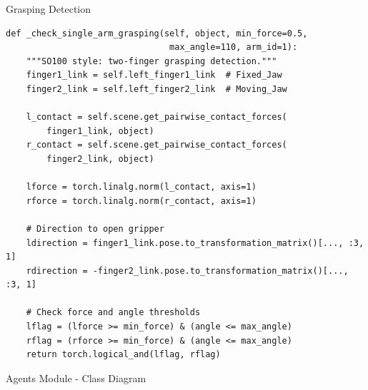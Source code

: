 \begin{frame}[fragile]{Grasping Detection}
\begin{lstlisting}
def _check_single_arm_grasping(self, object, min_force=0.5,
                                max_angle=110, arm_id=1):
    """SO100 style: two-finger grasping detection."""
    finger1_link = self.left_finger1_link  # Fixed_Jaw
    finger2_link = self.left_finger2_link  # Moving_Jaw

    l_contact = self.scene.get_pairwise_contact_forces(
        finger1_link, object)
    r_contact = self.scene.get_pairwise_contact_forces(
        finger2_link, object)

    lforce = torch.linalg.norm(l_contact, axis=1)
    rforce = torch.linalg.norm(r_contact, axis=1)

    # Direction to open gripper
    ldirection = finger1_link.pose.to_transformation_matrix()[..., :3, 1]
    rdirection = -finger2_link.pose.to_transformation_matrix()[..., :3, 1]

    # Check force and angle thresholds
    lflag = (lforce >= min_force) & (angle <= max_angle)
    rflag = (rforce >= min_force) & (angle <= max_angle)
    return torch.logical_and(lflag, rflag)
\end{lstlisting}
\end{frame}

\begin{frame}{Agents Module - Class Diagram}
\centering
{}
\end{frame}
